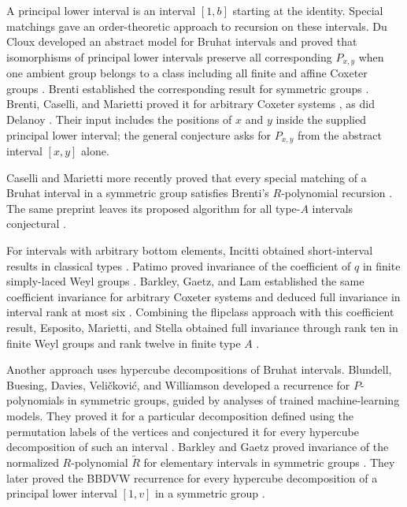 A principal lower interval is an interval $[1,b]$ starting at the
identity. Special matchings gave an order-theoretic approach to recursion
on these intervals. Du Cloux developed an abstract model for Bruhat
intervals \cite{duCloux00} and proved that isomorphisms of principal lower
intervals preserve all corresponding $P_{x,y}$ when one ambient group
belongs to a class including all finite and affine Coxeter groups
\cite{duCloux03}. Brenti established the corresponding result for
symmetric groups \cite{Brenti04}. Brenti, Caselli, and Marietti proved it
for arbitrary Coxeter systems
\cite[Theorem~7.8 and Corollary~8.4]{BCM06}, as did Delanoy
\cite[Theorem~7.2 and Corollary~7.3]{Delanoy06}.
Their input includes the positions of $x$ and $y$ inside the supplied
principal lower interval; the general conjecture asks for $P_{x,y}$ from the
abstract interval $[x,y]$ alone.

Caselli and Marietti more recently proved that every special matching of
a Bruhat interval in a symmetric group satisfies Brenti's $R$-polynomial
recursion \cite[Theorem~8.6]{CM26}. The same preprint leaves its proposed
algorithm for all type-$A$ intervals conjectural
\cite[Conjecture~8.13 and Proposition~8.15]{CM26}.

For intervals with arbitrary bottom elements, Incitti obtained
short-interval results in classical types \cite{Incitti07}.
Patimo proved invariance of the coefficient of $q$ in finite simply-laced
Weyl groups \cite{Patimo21}. Barkley, Gaetz, and Lam established the same
coefficient invariance for arbitrary Coxeter systems and deduced full
invariance in interval rank at most six
\cite[Corollaries~1.3 and~1.4]{BGL26}.
Combining the flipclass approach with this coefficient result, Esposito,
Marietti, and Stella obtained full invariance through rank ten in finite
Weyl groups and rank twelve in finite type $A$
\cite[Corollary~1.3(ii)]{EMS26}.

Another approach uses hypercube decompositions of Bruhat intervals.
Blundell, Buesing, Davies, Veli\v{c}kovi\'c, and Williamson developed a
recurrence for $P$-polynomials in symmetric groups, guided by analyses of
trained machine-learning models. They proved it for a particular
decomposition defined using the permutation labels of the vertices and
conjectured it for every hypercube decomposition of such an interval
\cite[Theorem~3.7 and Conjecture~3.8]{BBDVW22}.
Barkley and Gaetz proved invariance of the normalized $R$-polynomial
$\widetilde R$ for elementary intervals in symmetric groups
\cite[Theorem~1.6]{BG25Elementary}. They later proved the BBDVW recurrence
for every hypercube decomposition of a principal lower interval $[1,v]$
in a symmetric group \cite[Theorem~1.3]{BG26BBDVW}.

